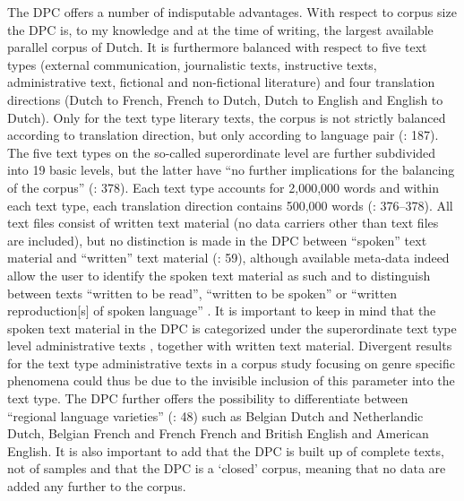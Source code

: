 The DPC offers a number of indisputable advantages. With respect to corpus size the DPC is, to my knowledge and at the time of writing, the largest available parallel corpus of Dutch. It is furthermore balanced with respect to five text types (external communication, journalistic texts, instructive texts, administrative text, fictional and non-fictional literature) and four translation directions (Dutch to French, French to Dutch, Dutch to English and English to Dutch). Only for the text type literary texts, the corpus is not strictly balanced according to translation direction, but only according to language pair (\citealt{spyns_dutch_2013}: 187). The five text types on the so-called superordinate level are further subdivided into 19 basic levels, but the latter have “no further implications for the balancing of the corpus” (\citealt{macken_dutch_2011}: 378). Each text type accounts for 2,000,000 words and within each text type, each translation direction contains 500,000 words (\citealt{macken_dutch_2011}: 376–378). All text files consist of written text material (no data carriers other than text files are included), but no distinction is made in the DPC between “spoken” text material and “written” text material (\citealt{delaere_translations_2015}: 59), although available meta-data indeed allow the user to identify the spoken text material as such and to distinguish between texts “written to be read”, “written to be spoken” or  “written reproduction[s] of spoken language” \citep[59]{delaere_translations_2015}. It is important to keep in mind that the spoken text material in the DPC is categorized under the superordinate text type level administrative texts \citep[59]{delaere_translations_2015}, together with written text material. Divergent results for the text type administrative texts in a corpus study focusing on genre specific phenomena could thus be due to the invisible inclusion of this parameter into the text type. The DPC further offers the possibility to differentiate between “regional language varieties” (\citealt{delaere_translations_2015}: 48) such as Belgian Dutch and Netherlandic Dutch, Belgian French and French French and British English and American English. It is also important to add that the DPC is built up of complete texts, not of samples and that the DPC is a ‘closed’ corpus, meaning that no data are added any further to the corpus.



